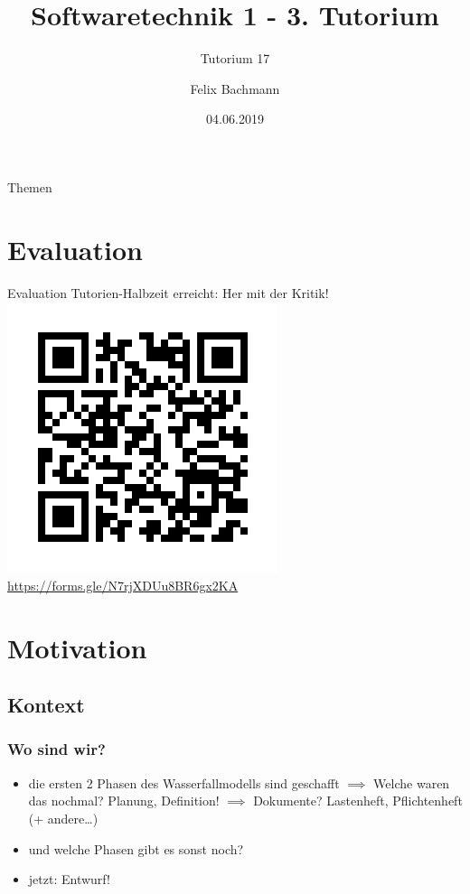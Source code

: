 \documentclass[18pt]{beamer}
\title[SWT1]{Softwaretechnik 1 - 3. Tutorium}
\subtitle{Tutorium 17}
\author{Felix Bachmann}
\date{04.06.2019}
\institute{KIT - Institut für Programmstrukturen und Datenorganisation (IPD)}
\begin{document}

\begin{frame}
\titlepage
\end{frame}

\begin{frame}{Themen}
\tableofcontents
\end{frame}

\section{Evaluation}
	\begin{frame}{Evaluation}
	\centering Tutorien-Halbzeit erreicht: Her mit der Kritik!
	\centering \includegraphics[scale=0.6]{pics/tut3/frame.png}
	\url{https://forms.gle/N7rjXDUu8BR6gx2KA}
\end{frame}

\section{Motivation}
	\subsection{Kontext}
		\begin{frame}
			\frametitle{Wo sind wir?}
			\begin{itemize}
				\item die ersten 2 Phasen des Wasserfallmodells sind geschafft
				\pause
				\linebreak $\implies$ Welche waren das nochmal? \pause Planung, Definition!
				\pause
				\linebreak $\implies$ Dokumente? \pause Lastenheft, Pflichtenheft (+ andere\dots)
				\pause
				\item und welche Phasen gibt es sonst noch? \pause
				\item  jetzt: Entwurf!
			\end{itemize}
		\end{frame}
	
\end{document}
